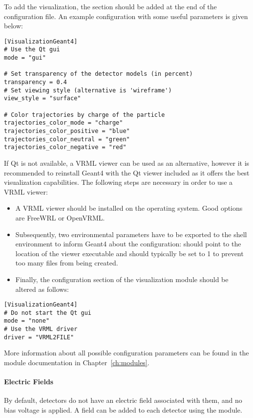 To add the visualization, the  section should be added at the end of the configuration file.
An example configuration with some useful parameters is given below:
\begin{verbatim}
[VisualizationGeant4]
# Use the Qt gui
mode = "gui"

# Set transparency of the detector models (in percent)
transparency = 0.4
# Set viewing style (alternative is 'wireframe')
view_style = "surface"

# Color trajectories by charge of the particle
trajectories_color_mode = "charge"
trajectories_color_positive = "blue"
trajectories_color_neutral = "green"
trajectories_color_negative = "red"
\end{verbatim}
If Qt is not available, a VRML viewer can be used as an alternative, however it is recommended to reinstall Geant4 with the Qt viewer included as it offers the best visualization capabilities.
The following steps are necessary in order to use a VRML viewer:
\begin{itemize}
\item A VRML viewer should be installed on the operating system.
Good options are FreeWRL or OpenVRML.
\item Subsequently, two environmental parameters have to be exported to the shell environment to inform Geant4 about the configuration:
 should point to the location of the viewer executable and  should typically be set to 1 to prevent too many files from being created.
\item Finally, the configuration section of the visualization module should be altered as follows:
\end{itemize}

\begin{verbatim}
[VisualizationGeant4]
# Do not start the Qt gui
mode = "none"
# Use the VRML driver
driver = "VRML2FILE"
\end{verbatim}

More information about all possible configuration parameters can be found in the module documentation in Chapter~\ref{ch:modules}.

\paragraph{Electric Fields}
\label{sec:module_electric_field}
By default, detectors do not have an electric field associated with them, and no bias voltage is applied.
A field can be added to each detector using the  module.


